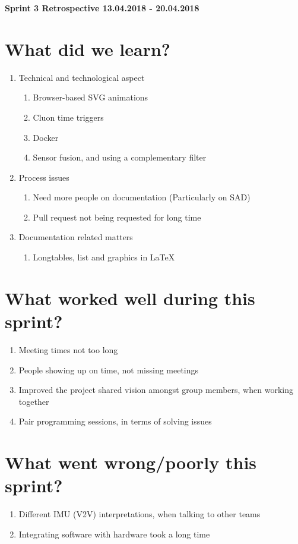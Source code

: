 \documentclass[11pt]{article}
\begin{document}
\centerline{\textbf{\LARGE  Sprint 3 Retrospective 13.04.2018 - 20.04.2018}}

\section*{What did we learn?}
\begin{enumerate}
	\item Technical and technological aspect
		\begin{enumerate} 
			\item Browser-based SVG animations
			\item Cluon time triggers
			\item Docker
			\item Sensor fusion, and using a complementary filter
		\end{enumerate} 
	\item Process issues
		\begin{enumerate} 
			\item Need more people on documentation (Particularly on SAD)
			\item Pull request not being requested for long time
		\end{enumerate}		
	\item Documentation related matters
		\begin{enumerate} 
			\item Longtables, list and graphics in LaTeX
		\end{enumerate}	
\end{enumerate} 

\section*{What worked well during this sprint?}
\begin{enumerate}
	\item Meeting times not too long 
	\item People showing up on time, not missing meetings
	\item Improved the project shared vision amongst group members, when working together
	\item Pair programming sessions, in terms of solving issues
\end{enumerate} 

\section*{What went wrong/poorly this sprint?}
\begin{enumerate}
	\item Different IMU (V2V) interpretations, when talking to other teams
	\item Integrating software with hardware took a long time
\end{enumerate} 
\end{document}
